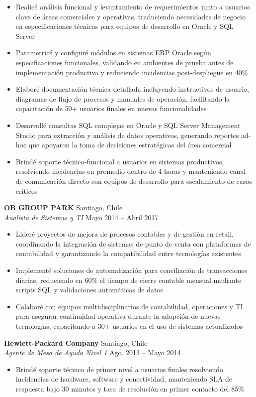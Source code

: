 \documentclass[11pt,letterpaper]{article}
\begin{document}
\begin{itemize}
  \item Realicé análisis funcional y levantamiento de requerimientos junto a usuarios clave de áreas comerciales y operativas, traduciendo necesidades de negocio en especificaciones técnicas para equipos de desarrollo en Oracle y SQL Server
  \item Parametricé y configuré módulos en sistemas ERP Oracle según especificaciones funcionales, validando en ambientes de prueba antes de implementación productiva y reduciendo incidencias post-despliegue en 40\%
  \item Elaboré documentación técnica detallada incluyendo instructivos de usuario, diagramas de flujo de procesos y manuales de operación, facilitando la capacitación de 50+ usuarios finales en nuevas funcionalidades
  \item Desarrollé consultas SQL complejas en Oracle y SQL Server Management Studio para extracción y análisis de datos operativos, generando reportes ad-hoc que apoyaron la toma de decisiones estratégicas del área comercial
  \item Brindé soporte técnico-funcional a usuarios en sistemas productivos, resolviendo incidencias en promedio dentro de 4 horas y manteniendo canal de comunicación directo con equipos de desarrollo para escalamiento de casos críticos
\end{itemize}
\vspace{2pt}
\textbf{OB GROUP PARK} \hfill Santiago, Chile\\
\textit{Analista de Sistemas y TI} \hfill Mayo 2014 – Abril 2017
\begin{itemize}
  \item Lideré proyectos de mejora de procesos contables y de gestión en retail, coordinando la integración de sistemas de punto de venta con plataformas de contabilidad y garantizando la compatibilidad entre tecnologías existentes
  \item Implementé soluciones de automatización para conciliación de transacciones diarias, reduciendo en 60\% el tiempo de cierre contable mensual mediante scripts SQL y validaciones automáticas de datos
  \item Colaboré con equipos multidisciplinarios de contabilidad, operaciones y TI para asegurar continuidad operativa durante la adopción de nuevas tecnologías, capacitando a 30+ usuarios en el uso de sistemas actualizados
\end{itemize}
\vspace{2pt}
\textbf{Hewlett-Packard Company} \hfill Santiago, Chile\\
\textit{Agente de Mesa de Ayuda Nivel 1} \hfill Ago. 2013 – Mayo 2014
\begin{itemize}
  \item Brindé soporte técnico de primer nivel a usuarios finales resolviendo incidencias de hardware, software y conectividad, manteniendo SLA de respuesta bajo 30 minutos y tasa de resolución en primer contacto del 85\%
\end{itemize}
\end{document}
